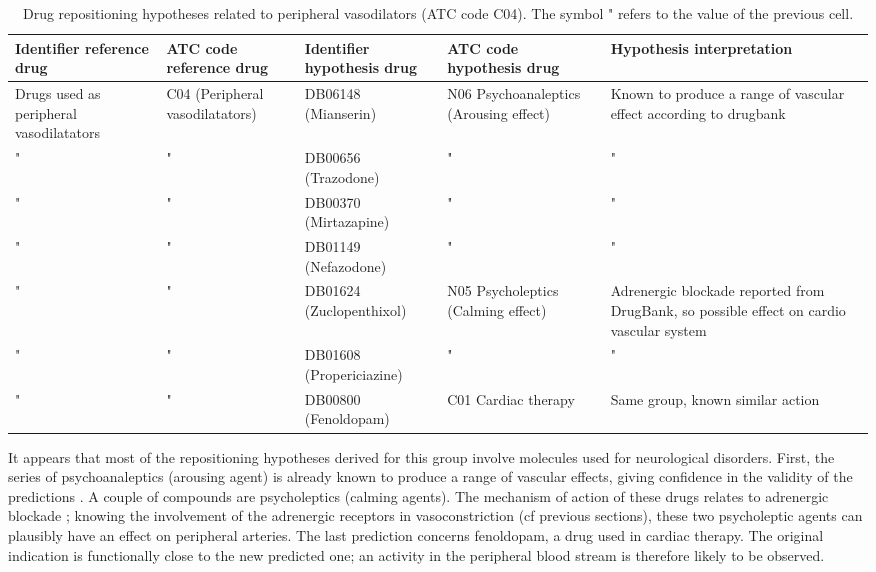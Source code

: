 \begin{table}[htbp]
\scriptsize
\begin{tabular}{|p{2cm}|p{2cm}|p{2cm}|p{3cm}|p{4cm}|}
\hline
\textbf{Identifier reference drug} & \textbf{ATC code reference drug} & \textbf{Identifier hypothesis drug} & \textbf{ATC code hypothesis drug} & \textbf{Hypothesis interpretation} \\ \hline
Drugs used as peripheral vasodilatators & C04 (Peripheral vasodilatators) & DB06148 (Mianserin) & N06 Psychoanaleptics (Arousing effect) & Known to produce a range of vascular effect according to drugbank \\ \hline
" & " & DB00656 (Trazodone) & " & " \\ \hline
" & " & DB00370 (Mirtazapine) & " & " \\ \hline
" & " & DB01149 (Nefazodone) & " & " \\ \hline
" & " & DB01624 (Zuclopenthixol) & N05 Psycholeptics (Calming effect) & Adrenergic blockade reported from DrugBank, so possible effect on cardio vascular system \\ \hline
" & " & DB01608 (Propericiazine) & " & " \\ \hline
" & " & DB00800 (Fenoldopam) & C01 Cardiac therapy & Same group, known similar action \\ \hline
\end{tabular}
\caption{Drug repositioning hypotheses related to peripheral vasodilators (ATC code C04). The symbol " refers to the value of the previous cell.}
\label{table:tablec04}
\end{table}

It appears that most of the repositioning hypotheses derived for this group involve molecules used for neurological disorders. First, the series of psychoanaleptics (arousing agent) is already known to produce a range of vascular effects, giving confidence in the validity of the predictions \citep{khalifa2003zuclopenthixol}. A couple of compounds are psycholeptics (calming agents). The mechanism of action of these drugs relates to adrenergic blockade \citep{khalifa2003zuclopenthixol}; knowing the involvement of the adrenergic receptors in vasoconstriction (cf previous sections), these two psycholeptic agents can plausibly have an effect on peripheral arteries. The last prediction concerns fenoldopam, a drug used in cardiac therapy. The original indication is functionally close to the new predicted one; an activity in the peripheral blood stream is therefore likely to be observed.

